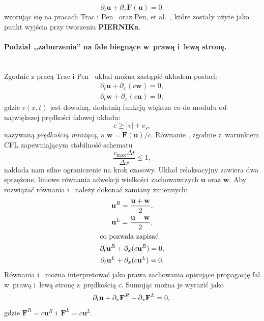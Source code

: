 \begin{equation}\label{diffeuler}
   \partial_t \mathbf{u} + \partial_{x} \mathbf{F}(\mathbf{u}) = 0.
\end{equation}
wzorując się na pracach Trac i Pen~\cite*{2003PASP..115..303T}
oraz Pen, et al.~\cite*{2003ApJS..149..447P}, które zostały użyte jako punkt
wyjścia przy tworzeniu \textbf{PIERNIKa}. 

\paragraph{Podział ,,zaburzenia'' na fale biegnące w~prawą i~lewą stronę.} ~\\
%
Zgodnie z pracą Trac i Pen~\cite{2003PASP..115..303T} układ  można zastąpić układem postaci:
%
\begin{gather}
   \partial_t \mathbf{u} + \partial_x (c\mathbf{w}) = 0, \label{rel1}\\
   \partial_t \mathbf{w} + \partial_x (c\mathbf{u}) = 0, \label{rel2}
\end{gather}
%
gdzie $c(x,t)$ jest dowolną, dodatnią funkcją większa co do modułu od
największej prędkości falowej układu: 
%
\begin{equation}\label{fs}
   c \ge |v| + c_s,
\end{equation}
nazywaną \emph{prędkością mrożącą}, a $\mathbf{w} = \mathbf{F}(\mathbf{u})/c$. 
Równanie , zgodnie z~warunkiem CFL zapewniającym stabilność schematu
%
\begin{equation}\label{cfl}
   \frac{c_{\textrm{max}}\Delta t}{\Delta x} \le 1,
\end{equation}
%
nakłada nam silne ograniczenie na krok czasowy.  Układ relaksacyjny zawiera dwa
sprzężone, liniowe równania adwekcji wielkości zachowawczych $\mathbf{u}$ oraz
$\mathbf{w}$. Aby rozwiązać równania  i~ należy dokonać
zamiany zmiennych:
%
\begin{gather}
   \mathbf{u}^R = \frac{\mathbf{u} + \mathbf{w}}{2}, \\
   \mathbf{u}^L = \frac{\mathbf{u} - \mathbf{w}}{2}, \\
   \intertext{co pozwala zapisać}
   \partial_t \mathbf{u}^R + \partial_x (c\mathbf{u}^R) = 0,\label{rel3}\\
   \partial_t \mathbf{u}^L + \partial_x (c\mathbf{u}^L) = 0.\label{rel4}
\end{gather}
%
Równania  i~ można interpretować jako prawa zachowania
opisujące propagację fal w~pra\-wą i~lewą stronę z~prędkością $c$. Sumując można
je wyrazić jako
%
\begin{equation}
   \partial_t \mathbf{u} + \partial_x \mathbf{F}^R - \partial_x \mathbf{F}^L = 0,\\
\end{equation}
%
gdzie $\mathbf{F}^R=c \mathbf{u}^R$ i~$\mathbf{F}^L=c \mathbf{u}^L$. 
%
